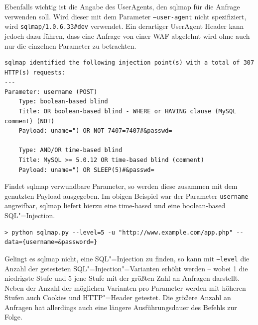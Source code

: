 Ebenfalls wichtig ist die Angabe des UserAgents, den sqlmap für die Anfrage verwenden soll. Wird dieser mit dem Parameter \texttt{--user-agent} nicht spezifiziert, wird \texttt{sqlmap/1.0.6.33\#dev} verwendet. Ein derartiger UserAgent Header kann jedoch dazu führen, dass eine Anfrage von einer WAF abgelehnt wird ohne auch nur die einzelnen Parameter zu betrachten.



\begin{listing}
\begin{verbatim}
sqlmap identified the following injection point(s) with a total of 307 HTTP(s) requests:
---
Parameter: username (POST)
    Type: boolean-based blind
    Title: OR boolean-based blind - WHERE or HAVING clause (MySQL comment) (NOT)
    Payload: uname=") OR NOT 7407=7407#&passwd=

    Type: AND/OR time-based blind
    Title: MySQL >= 5.0.12 OR time-based blind (comment)
    Payload: uname=") OR SLEEP(5)#&passwd=
\end{verbatim}
\end{listing}

Findet sqlmap verwundbare Parameter, so werden diese zusammen mit dem genutzten Payload ausgegeben. Im obigen Beispiel war der Parameter \texttt{username} angreifbar, sqlmap liefert hierzu eine time-based und eine boolean-based SQL"=Injection.

\begin{listing}[ht!]
\begin{verbatim}
> python sqlmap.py --level=5 -u "http://www.example.com/app.php" --data={username=&password=}
\end{verbatim}
\end{listing}

Gelingt es sqlmap nicht, eine SQL"=Injection zu finden, so kann mit \texttt{--level} die Anzahl der getesteten SQL"=Injection"=Varianten erhöht werden -- wobei 1 die niedrigste Stufe und 5 jene Stufe mit der größten Zahl an Anfragen darstellt. Neben der Anzahl der möglichen Varianten pro Parameter werden mit höheren Stufen auch Cookies und HTTP"=Header getestet. Die größere Anzahl an Anfragen hat allerdings auch eine längere Ausführungsdauer des Befehls zur Folge.

